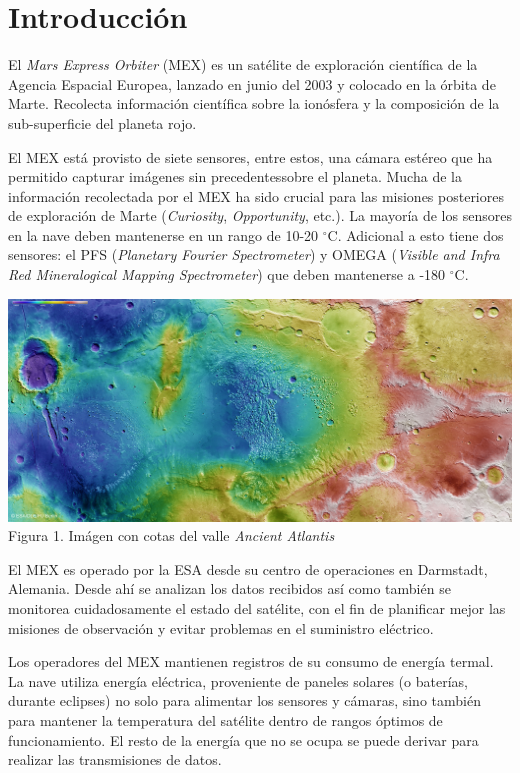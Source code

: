 \documentclass[../Main.tex]{subfiles}
\begin{document}
\section{Introducción}

El \textit{Mars Express Orbiter} (MEX) es un satélite de exploración científica de la Agencia Espacial Europea, lanzado en junio del 2003 y colocado en la órbita de Marte. Recolecta información científica sobre la ionósfera y la composición de la sub-superficie del planeta rojo.
\newline \par
El MEX está provisto de siete sensores, entre estos, una cámara estéreo que ha permitido capturar imágenes sin precedentessobre el planeta. Mucha de la información recolectada por el MEX ha sido crucial para las misiones posteriores de exploración de Marte (\textit{Curiosity}, \textit{Opportunity}, etc.). La mayoría de los sensores en la nave deben mantenerse en un rango de 10-20 $^{\circ}$C. Adicional a esto tiene dos sensores: el PFS (\textit{Planetary Fourier Spectrometer}) y OMEGA (\textit{Visible and Infra Red Mineralogical Mapping Spectrometer}) que deben mantenerse a -180 $^{\circ}$C.
\begin{center}
\includegraphics[width=\linewidth, trim={0 10cm 0 0}, clip]{Assets/Ancient_Atlantis.jpg}
\\Figura 1. Imágen con cotas del valle \textit{Ancient Atlantis}
\end{center}
El MEX es operado por la ESA desde su centro de operaciones en Darmstadt, Alemania. Desde ahí se analizan los datos recibidos así como también se monitorea cuidadosamente el estado del satélite, con el fin de planificar mejor las misiones de observación y evitar problemas en el suministro eléctrico.
\newline \par
Los operadores del MEX mantienen registros de su consumo de energía termal. La nave utiliza energía eléctrica, proveniente de paneles solares (o baterías, durante eclipses) no solo para alimentar los sensores y cámaras, sino también para mantener la temperatura del satélite dentro de rangos óptimos de funcionamiento. El resto de la energía que no se ocupa se puede derivar para realizar las transmisiones de datos.
\end{document}
